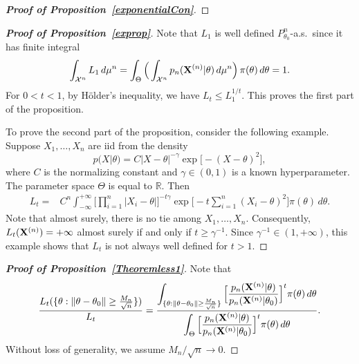\documentclass[11pt]{article}
\theoremstyle{plain}
\theoremstyle{definition}
\theoremstyle{remark}
\begin{document}
\begin{appendices}
\begin{proof}[\textbf{Proof of Proposition~\ref{exponentialCon}}]
\end{proof}

\begin{proof}[\textbf{Proof of Proposition~\ref{exprop}}]

Note that $L_1$ is well defined $P_{\theta_0}^n$-a.s.\ since it has finite integral
$$
\int_{\mathcal{X}^n} L_1 \, d\mu^n=
\int_{\Theta}\Big(\int_{\mathcal{X}^n} p_n(\mathbf{X}^{(n)}|\theta) \, d\mu^n \Big) \, \pi(\theta)\, d\theta=1.
$$
For $0<t<1$, by H\"older's inequality, we have $L_{t}\leq L_1^{1/t}$. This proves the first part of the proposition. 

To prove the second part of the proposition, consider the following example.
Suppose $X_1,\ldots,X_n$ are iid from the density
$$
    p(X|\theta)=C |X-\theta|^{-\gamma}\exp\big[-(X-\theta)^2\big]
,
$$
where $C$ is the normalizing constant and $\gamma\in(0,1)$ is a known hyperparameter. The parameter space $\Theta$ is equal to $\mathbb{R}$.
Then
$$
    \begin{aligned}
        L_t=&
    C^n \int_{-\infty}^{+\infty}
\Big[\prod_{i=1}^n |X_i-\theta|\Big]^{-t\gamma}
    \exp \big[-t\sum_{i=1}^n (X_i-\theta)^2 \big]
        \pi(\theta)
    \,
    d \theta.
    \end{aligned}
$$
Note that almost surely, there is no tie among $X_1,\ldots,X_n$. Consequently, $L_t(\mathbf{X}^{(n)})=+\infty$ almost surely if and only if $t\geq \gamma^{-1}$.
Since $\gamma^{-1}\in (1,+\infty)$, this example shows that $L_t$ is not always well defined for $t>1$.

\end{proof}



\begin{proof}[\textbf{Proof of Proposition~\ref{Theoremless1}}]
    Note that
       \begin{equation}\label{eq:numden}
       \frac{L_{t} (\{\theta: \|\theta-\theta_0\|\geq \frac{M_n}{\sqrt{n}}\})}
           {L_{t}}
=
    \frac{\displaystyle
        \int_{\{\theta: \|\theta-\theta_0\|\geq \frac{M_n}{\sqrt{n}}\}} \Big[ \frac{p_n(\mathbf{X}^{(n)}|\theta)}{p_n(\mathbf{X}^{(n)}|\theta_0)} \Big]^{t} \pi(\theta) \, d \theta
    }{\displaystyle
        \int_{\Theta} \Big[ \frac{p_n(\mathbf{X}^{(n)}|\theta)}{p_n(\mathbf{X}^{(n)}|\theta_0)} \Big]^{t} \pi(\theta) \, d \theta
    }.
       \end{equation}
    Without loss of generality, we assume ${M_n}/{\sqrt{n}}\to 0$.


\end{proof}
\end{appendices}
\end{document}
